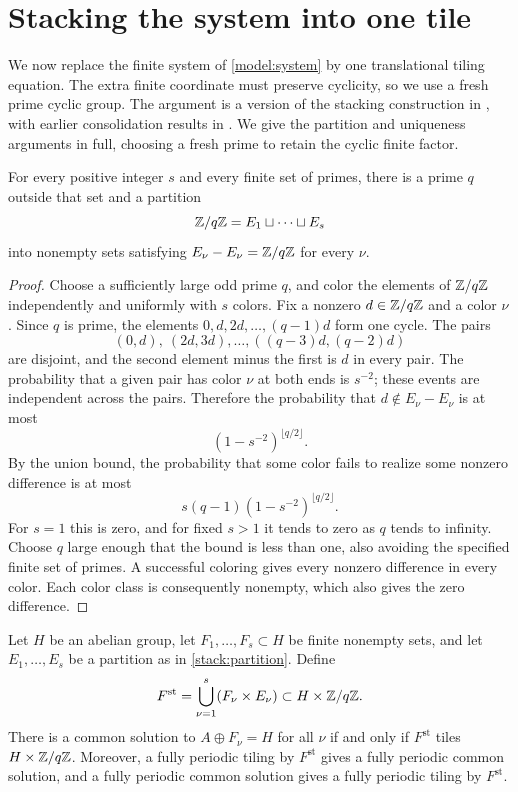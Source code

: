 \section{Stacking the system into one tile}
\label{sec:stacking}

We now replace the finite system of \cref{model:system} by one
translational tiling equation.  The extra finite coordinate must preserve
cyclicity, so we use a fresh prime cyclic group.  The argument is a
version of the stacking construction in
\citet[Theorem~3.1 and Lemma~3.2]{GTPeriodic}, with earlier
consolidation results in \citet[Theorem~1.15 and Section~3]{GTTwoTiles}.
We give the partition and uniqueness arguments in full, choosing a
fresh prime to retain the cyclic finite factor.

\begin{lemma}
\label{stack:partition}
For every positive integer $s$ and every finite set of primes, there is
a prime $q$ outside that set and a partition
\[
  \mathbb Z/q\mathbb Z=E_1\sqcup\cdots\sqcup E_s
\]
into nonempty sets satisfying $E_\nu-E_\nu=\mathbb Z/q\mathbb Z$ for every $\nu$.
\end{lemma}

\begin{proof}
Choose a sufficiently large odd prime $q$, and color the elements of
$\mathbb Z/q\mathbb Z$ independently and uniformly with $s$ colors.  Fix a nonzero
$d\in\mathbb Z/q\mathbb Z$ and a color $\nu$.  Since $q$ is prime, the elements
$0,d,2d,\ldots,(q-1)d$ form one cycle.  The pairs
\[
 (0,d),\ (2d,3d),\ldots,
 ((q-3)d,(q-2)d)
\]
are disjoint, and the second element minus the first is $d$ in every
pair.  The probability that a given pair has color $\nu$ at both ends
is $s^{-2}$; these events are independent across the pairs.  Therefore
the probability that $d\notin E_\nu-E_\nu$ is at most
\[
 (1-s^{-2})^{\lfloor q/2\rfloor}.
\]
By the union bound, the probability that some color fails to realize
some nonzero difference is at most
\[
 s(q-1)(1-s^{-2})^{\lfloor q/2\rfloor}.
\]
For $s=1$ this is zero, and for fixed $s>1$ it tends to zero as $q$
tends to infinity.  Choose $q$ large enough that the bound is less than
one, also avoiding the specified finite set of primes.  A successful
coloring gives every nonzero difference in every color.  Each color
class is consequently nonempty, which also gives the zero difference.
\end{proof}

\begin{proposition}
\label{stack:equivalence}
Let $H$ be an abelian group, let $F_1,\ldots,F_s\subset H$ be finite
nonempty sets, and let $E_1,\ldots,E_s$ be a partition as in
\cref{stack:partition}.  Define
\[
 F^{\mathrm{st}}=\bigcup_{\nu=1}^s(F_\nu\times E_\nu)
 \subset H\times\mathbb Z/q\mathbb Z.
\]
There is a common solution to $A\oplus F_\nu=H$ for all $\nu$ if and
only if $F^{\mathrm{st}}$ tiles $H\times\mathbb Z/q\mathbb Z$.  Moreover, a
fully periodic tiling by $F^{\mathrm{st}}$ gives a fully periodic
common solution, and a fully periodic common solution gives a fully
periodic tiling by $F^{\mathrm{st}}$.
\end{proposition}


